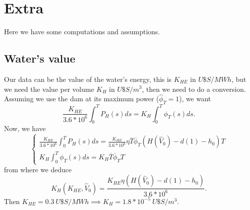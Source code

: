 \documentclass[12pt]{article}
\theoremstyle{definition}
\theoremstyle{remark}
\begin{document}


\section{Extra}

Here we have some computations and assumptions.

\subsection{Water's value}

Our data can be the value of the water's energy, this is $K_{HE}$ in $U\$S/MWh$, but we need the value per volume $K_H$ in $U\$S/m^3$, then we need to do a conversion. Assuming we use the dam at its maximum power ($\hat{\phi}_T=1$), we want
\begin{equation*}
\frac{K_{HE}}{3.6*10^6}\int_0^TP_H(s)ds=K_H\int_0^T\phi_T(s)ds.
\end{equation*}
Now, we have
\begin{equation*}
\begin{cases}
\frac{K_{HE}}{3.6*10^6}\int_0^TP_H(s)ds=\frac{K_{HE}}{3.6*10^6}\eta\overline{T}\overline{\phi}_T(H(\hat{V}_0)-d(1)-h_0)T\\
K_H\int_0^T\phi_T(s)ds=K_H\overline{T}\overline{\phi}_TT
\end{cases}
\end{equation*}
from where we deduce
\begin{equation*}
K_H(K_{HE},\hat{V}_0)=\frac{K_{HE}\eta(H(\hat{V}_0)-d(1)-h_0)}{3.6*10^6}.
\end{equation*}
Then $K_{HE}=0.3\ U\$S/MWh\implies K_H=1.8*10^{-5}\ U\$S/m^3$.
\end{document}
